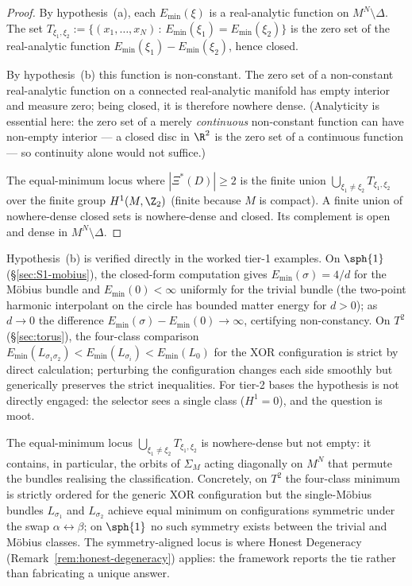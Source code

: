 \begin{proof}
By hypothesis~(a), each $E_{\min}(\xi)$ is a real-analytic function
on $M^N\setminus\Delta$. The set
$T_{\xi_1,\xi_2}:=\{(x_1,\dots,x_N)\,:\,
E_{\min}(\xi_1)=E_{\min}(\xi_2)\}$ is the zero set of the
real-analytic function $E_{\min}(\xi_1)-E_{\min}(\xi_2)$, hence
closed.

By hypothesis~(b) this function is non-constant. The zero set of a
non-constant real-analytic function on a connected real-analytic
manifold has empty interior and measure zero; being closed, it is
therefore nowhere dense. (Analyticity is essential here: the zero
set of a merely \emph{continuous} non-constant function can have
non-empty interior --- a closed disc in $\R^2$ is the zero set of a
continuous function --- so continuity alone would not suffice.)

The equal-minimum locus where $|\Xi^*(D)|\geq 2$ is the finite union
$\bigcup_{\xi_1\neq\xi_2}T_{\xi_1,\xi_2}$ over the finite group
$H^1(M,\Z_2)$ (finite because $M$ is compact). A finite union of
nowhere-dense closed sets is nowhere-dense and closed. Its
complement is open and dense in $M^N\setminus\Delta$.
\end{proof}

\begin{remark}\label{rem:nondegeneracy-verification}
Hypothesis~(b) is verified directly in the worked tier-1 examples.
On $\sph{1}$ (\S\ref{sec:S1-mobius}), the closed-form computation
gives $E_{\min}(\sigma)=4/d$ for the M\"obius bundle and
$E_{\min}(0)<\infty$ uniformly for the trivial bundle (the
two-point harmonic interpolant on the circle has bounded matter
energy for $d>0$); as $d\to 0$ the difference $E_{\min}(\sigma)-
E_{\min}(0)\to\infty$, certifying non-constancy. On $T^2$
(\S\ref{sec:torus}), the four-class comparison
$E_{\min}(L_{\sigma_1\sigma_2})<E_{\min}(L_{\sigma_i})<E_{\min}(L_0)$
for the XOR configuration is strict by direct calculation; perturbing
the configuration changes each side smoothly but generically
preserves the strict inequalities. For tier-2 bases the hypothesis
is not directly engaged: the selector sees a single class
($H^1=0$), and the question is moot.
\end{remark}

\begin{remark}\label{rem:symmetry-degeneracy}
The equal-minimum locus
$\bigcup_{\xi_1\neq\xi_2}T_{\xi_1,\xi_2}$ is nowhere-dense but not
empty: it contains, in particular, the orbits of $\Sigma_M$ acting
diagonally on $M^N$ that permute the bundles realising the
classification. Concretely, on $T^2$ the four-class minimum is
strictly ordered for the generic XOR configuration but the
single-M\"obius bundles $L_{\sigma_1}$ and $L_{\sigma_2}$ achieve
equal minimum on configurations symmetric under the swap
$\alpha\leftrightarrow\beta$; on $\sph{1}$ no such symmetry exists
between the trivial and M\"obius classes. The symmetry-aligned
locus is where Honest Degeneracy
(Remark~\ref{rem:honest-degeneracy}) applies: the framework reports
the tie rather than fabricating a unique answer.
\end{remark}

